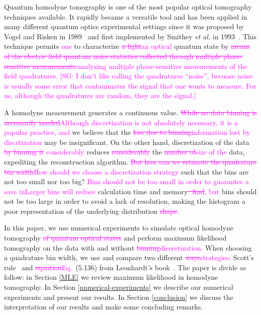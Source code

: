 \documentclass[
reprint,
superscriptaddress,
showpacs,
amsmath,
amssymb,
aps,
pra,
longbibliography
]{revtex4-1}
\providecommand{\aucmnt}[1]{#1}
\providecommand{\editcolor}[2]{\textcolor{#1}{#2}}
\providecommand{\aucmnt}[1]{}
\providecommand{\editcolor}[2]{#2}
\newcommand{\SG}[1]{\editcolor{magenta}{#1}}
\newcommand{\SGs}[1]{\aucmnt{\editcolor{magenta}{\sout{#1}}}}
\newcommand{\SGc}[1]{\aucmnt{\editcolor{magenta}{[SG: #1]}}}
\begin{document}
Quantum homodyne tomography is one of the most popular optical
tomography techniques available\SG{\cite{Lvovsky2004}}. It rapidly
became a versatile tool and has been applied in many different quantum
optics experimental settings since it was proposed by Vogel and Risken
in 1989~\cite{Vogel1989} and first implemented by Smithey \textit{et
  al.}  in 1993~\cite{Smithey1993}. This technique permits \SG{one} to
characterize \SGs{a light}\SG{an optical} quantum state by \SGs{means
  of the electric field quantum noise statistics collected through
  multiple phase-sensitive measurements.}\SG{analyzing multiple
  phase-sensitive measurements of the field quadratures.} \SGc{I don't
  like calling the quadratures ``noise'', becuase noise is usually
  some error that contanimates the signal that one wants to measure.
  For us, although the quadratures are random, they are the signal.}

A homodyne measurement generates a continuous value.  \SGs{While no
  data binning is necessarily needed}\SG{Although discretization is
  not absolutely necessary, it is a popular practice, and} we believe
that the \SGs{loss due to binning}\SG{information lost by
  discrtization} may be insignificant. On the other hand,
discretization of the data \SGs{by binning it} \SG{considerably}
reduces \SGs{considerably} the \SGs{number of}\SG{size of the} data,
expediting the reconstruction algorithm. \SGs{But how can we estimate
  the quadrature bin width}\SG{How should we choose a discretization
  strategy} such that the bins are not too small nor too big? \SG{Bins
  should not be too small in order to guarantee a save in}\SG{Larger
  bins will reduce} calculation time and memory\SGs{. And}\SG{, but}
bins should not be too large in order to avoid a lack of resolution,
making the histogram a poor representation of the underlying
distribution\SGs{ shape}.
 
In this paper, we use numerical experiments to simulate optical
homodyne tomography \SGs{of quantum optical states} and perform
maximum likelihood tomography on the data with and without
\SGs{binning}\SG{discretization}. When choosing a quadrature bin
width, we use and compare two different \SGs{ways}\SG{strategies}:
Scott's rule~\cite{Scott2010} and \SGs{equation}\SG{Eq.~}(5.136) from
Leonhardt's book~\cite{Leonhardt1997}. The paper is divide as follow:
in Section \ref{MLE} we review maximum likelihood in homodyne
tomography.  In Section \ref{numerical-experiments} we describe our
numerical experiments and present our results. In Section
\ref{conclusion} we discuss the interpretation of our results and make
some concluding remarks.
\end{document}
